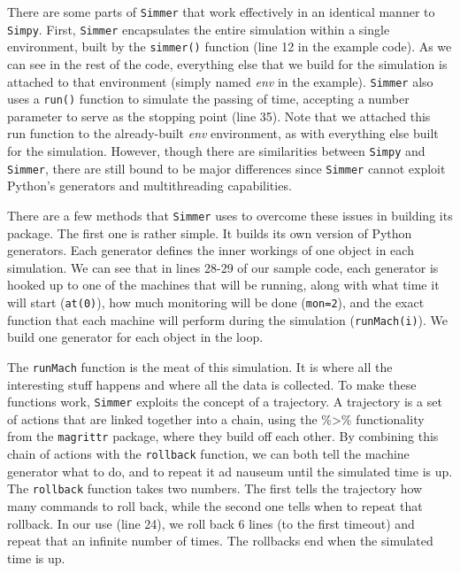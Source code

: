\documentclass[a4paper, 11pt]{article} %
\begin{document}
There are some parts of \texttt{Simmer} that work effectively in an identical manner to \texttt{Simpy}. First, \texttt{Simmer} encapsulates the entire simulation within a single environment, built by the \texttt{simmer()} function (line 12 in the example code). As we can see in the rest of the code, everything else that we build for the simulation is attached to that environment (simply named \textit{env} in the example). \texttt{Simmer} also uses a \texttt{run()} function to simulate the passing of time, accepting a number parameter to serve as the stopping point (line 35). Note that we attached this run function to the already-built \textit{env} environment, as with everything else built for the simulation. However, though there are similarities between \texttt{Simpy} and \texttt{Simmer}, there are still bound to be major differences since \texttt{Simmer} cannot exploit Python's generators and multithreading capabilities.

There are a few methods that \texttt{Simmer} uses to overcome these issues in building its package. The first one is rather simple. It builds its own version of Python generators. Each generator defines the inner workings of one object in each simulation. We can see that in lines 28-29 of our sample code, each generator is hooked up to one of the machines that will be running, along with what time it will start (\texttt{at(0)}), how much monitoring will be done (\texttt{mon=2}), and the exact function that each machine will perform during the simulation (\texttt{runMach(i)}). We build one generator for each object in the loop.

The \texttt{runMach} function is the meat of this simulation. It is where all the interesting stuff happens and where all the data is collected. To make these functions work, \texttt{Simmer} exploits the concept of a trajectory. A trajectory is a set of actions that are linked together into a chain, using the \%>\% functionality from the \texttt{magrittr} package, where they build off each other. By combining this chain of actions with the \texttt{rollback} function, we can both tell the machine generator what to do, and to repeat it ad nauseum until the simulated time is up. The \texttt{rollback} function takes two numbers. The first tells the trajectory how many commands to roll back, while the second one tells when to repeat that rollback. In our use (line 24), we roll back 6 lines (to the first timeout) and repeat that an infinite number of times. The rollbacks end when the simulated time is up.
\end{document}
